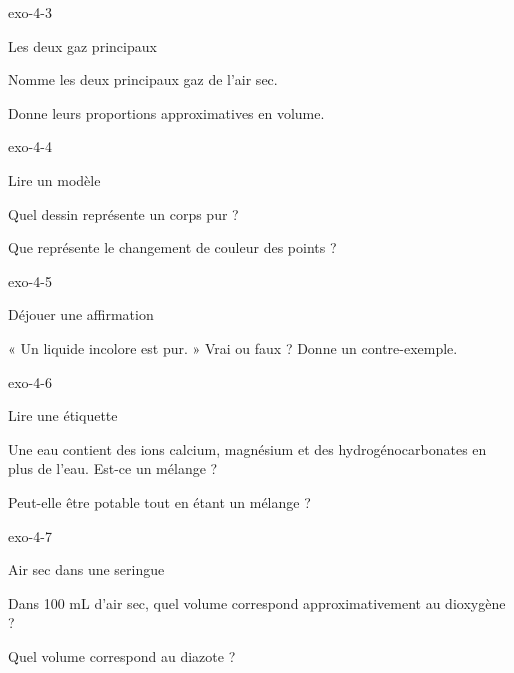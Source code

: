 \documentclass[12pt,twoside,openany]{book}
\begin{document}
\begin{blocLivre}{exo-4-3}
\begin{exercice}[1]{Les deux gaz principaux}
\begin{questions}
\item Nomme les deux principaux gaz de l’air sec.
\item Donne leurs proportions approximatives en volume.
\end{questions}
\end{exercice}\end{blocLivre}
\begin{blocLivre}{exo-4-4}
\begin{exercice}[1]{Lire un modèle}
\begin{questions}
\item Quel dessin représente un corps pur ?
\item Que représente le changement de couleur des points ?
\end{questions}
\end{exercice}\end{blocLivre}
\begin{blocLivre}{exo-4-5}
\begin{exercice}[1]{Déjouer une affirmation}
\begin{questions}
\item « Un liquide incolore est pur. » Vrai ou faux ? Donne un contre-exemple.
\end{questions}
\end{exercice}\end{blocLivre}
\begin{blocLivre}{exo-4-6}
\begin{exercice}[2]{Lire une étiquette}
\begin{questions}
\item Une eau contient des ions calcium, magnésium et des hydrogénocarbonates en plus de l’eau. Est-ce un mélange ?
\item Peut-elle être potable tout en étant un mélange ?
\end{questions}
\end{exercice}\end{blocLivre}
\begin{blocLivre}{exo-4-7}
\begin{exercice}[2]{Air sec dans une seringue}
\begin{questions}
\item Dans 100 mL d’air sec, quel volume correspond approximativement au dioxygène ?
\item Quel volume correspond au diazote ?
\end{questions}
\end{exercice}\end{blocLivre}
\end{document}
